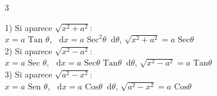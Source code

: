 \documentclass[9pt,landscape,a4paper]{article}
\newcommand{\dd}{\mathop{}\!\mathrm{d}}
\begin{document}
\begin{multicols}{3}
\begin{tcolorbox}[colback=primary!3,colframe=primary,fonttitle=\bfseries,title=Sustitución Trigonométrica]
1) Si aparece $\sqrt{x^2+a^2}$: \\
$x = a \text{ Tan } \theta$, $\dd x = a \text{ Sec}^2 \theta \dd\theta$, $\sqrt{x^2+a^2} = a \text{ Sec}\theta$ \\
\vspace{0.1cm}
2) Si aparece $\sqrt{x^2-a^2}$: \\
$x = a \text{ Sec } \theta$, $\dd x = a \text{ Sec}\theta \text{ Tan}\theta \dd\theta$, $\sqrt{x^2-a^2} = a \text{ Tan}\theta$ \\
\vspace{0.1cm}
3) Si aparece $\sqrt{a^2-x^2}$: \\
$x = a \text{ Sen } \theta$, $\dd x = a \text{ Cos}\theta \dd\theta$, $\sqrt{a^2-x^2} = a \text{ Cos}\theta$
\end{tcolorbox}

\end{multicols}
\end{document}
